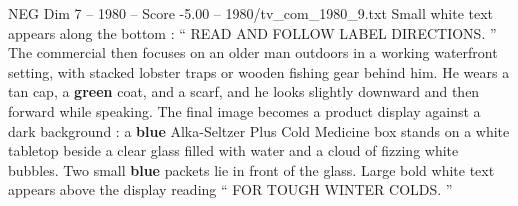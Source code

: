 \begin{textsample}{NEG Dim 7 – 1980 – Score -5.00 – 1980/tv\_com\_1980\_9.txt}
Small white text appears along the bottom : “ READ AND FOLLOW LABEL DIRECTIONS. ” The commercial then focuses on an older man outdoors in a working waterfront setting, with stacked lobster traps or wooden fishing gear behind him.
He wears a tan cap, a \textbf{green} coat, and a scarf, and he looks slightly downward and then forward while speaking.
The final image becomes a product display against a dark background : a \textbf{blue} Alka-Seltzer Plus Cold Medicine box stands on a white tabletop beside a clear glass filled with water and a cloud of fizzing white bubbles.
Two small \textbf{blue} packets lie in front of the glass.
Large bold white text appears above the display reading “ FOR TOUGH WINTER COLDS. ”

\end{textsample}
